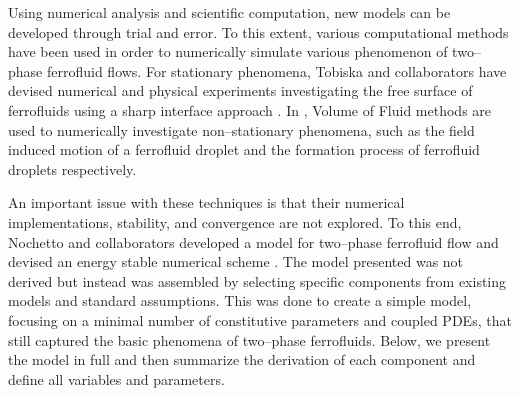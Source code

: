 \documentclass[11pt,fullpage]{article}
\theoremstyle{lemma}
\theoremstyle{definition}
\theoremstyle{lemma}
\begin{document}
Using numerical analysis and scientific computation, new models can be developed through trial and error. To this extent, various computational methods have been used in order to numerically simulate various phenomenon of two--phase ferrofluid flows. For stationary phenomena, Tobiska and collaborators have devised numerical and physical experiments investigating the free surface of ferrofluids using a sharp interface approach \cite{Tob:1, Tob:2, Tob:3}. In \cite{Numerics:1, Numerics:2}, Volume of Fluid methods are used to numerically investigate non--stationary phenomena, such as the field induced motion of a ferrofluid droplet and the formation process of ferrofluid droplets respectively. 

An important issue with these techniques is that their numerical implementations, stability, and convergence are not explored. To this end, Nochetto and collaborators developed a model for two--phase ferrofluid flow and devised an energy stable numerical scheme \cite{DiffuseInterface}. The model presented was not derived but instead was assembled by selecting specific components from existing models and standard assumptions. This was done to create a simple model, focusing on a minimal number of constitutive parameters and coupled PDEs, that still captured the basic phenomena of two--phase ferrofluids. Below, we present the model in full and then summarize the derivation of each component and define all variables and parameters.
\end{document}
